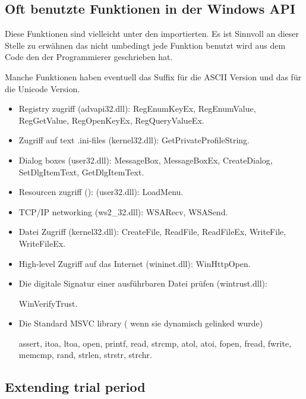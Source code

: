 \subsection{Oft benutzte Funktionen in der Windows API}

Diese Funktionen sind vielleicht unter den importierten.
Es ist Sinnvoll an dieser Stelle zu erwähnen das nicht umbedingt jede Funktion benutzt wird aus 
dem Code den der Programmierer geschrieben hat.

Manche Funktionen haben eventuell das  Suffix für die ASCII Version und das  für die Unicode Version.


\begin{itemize}

\item
Registry zugriff (advapi32.dll): 
RegEnumKeyEx, RegEnumValue, RegGetValue, RegOpenKeyEx, RegQueryValueEx.

\item
Zugriff auf text .ini-files (kernel32.dll): 
GetPrivateProfileString.

\item
Dialog boxes (user32.dll): 
MessageBox, MessageBoxEx, CreateDialog, SetDlgItemText, GetDlgItemText.

\item
Resourcen zugriff (): (user32.dll): LoadMenu.

\item
TCP/IP networking (ws2\_32.dll):
WSARecv, WSASend.

\item
Datei Zugriff (kernel32.dll):
CreateFile, ReadFile, ReadFileEx, WriteFile, WriteFileEx.

\item
High-level Zugriff auf das Internet (wininet.dll): WinHttpOpen.

\item
Die digitale Signatur einer ausführbaren Datei prüfen (wintrust.dll):

WinVerifyTrust.

\item
Die Standard MSVC library ( wenn sie dynamisch gelinked wurde) 

assert, itoa, ltoa, open, printf, read, strcmp, atol, atoi, fopen, fread, fwrite, memcmp, rand,
strlen, strstr, strchr.

\end{itemize}

\subsection{Extending trial period}

